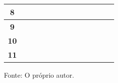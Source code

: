\begin{table}[H]
\begin{center}
{\begin{tabular}{|c||c|c|c|c|c||c|c|c|c|c|c|c|}
        \hline
        \textbf{\small{8}} & & & & & \cellcolor{black} & \cellcolor{black} & \cellcolor{black} & \cellcolor{black} & & & &\\
        \hline
        \textbf{\small{9}} & & & & & & & \cellcolor{black} & \cellcolor{black} & & & &\\
        \hline
        \textbf{\small{10}} & & & & & & & & \cellcolor{black} & \cellcolor{black} & \cellcolor{black} & &\\
        \hline
        \textbf{\small{11}} & & & & & & & & & \cellcolor{black} & \cellcolor{black} & \cellcolor{black} &\\
        \hline
      \end{tabular}
      }
    \end{center}
	Fonte: O próprio autor.
\end{table}


 
